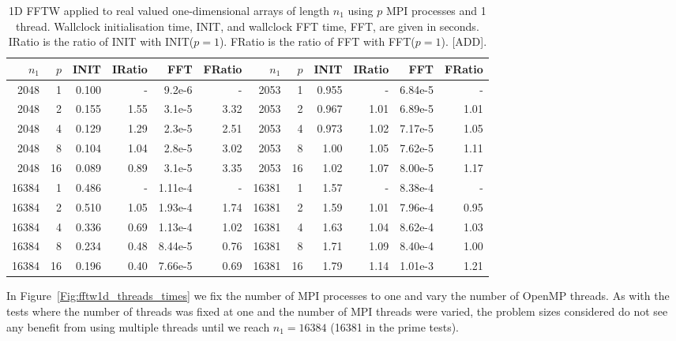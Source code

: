 \documentclass[a4]{article}
\begin{document}
\begin{table}
\begin{center}
\begin{tabular}{|r|r|r|r|r|r||r|r|r|r|r|r|}
\hline $n_1$ & $p$ & INIT & IRatio & FFT & FRatio & $n_1$ & $p$ & INIT & IRatio & FFT & FRatio  \\ \hline
2048 & 1 & 0.100 & -     & 9.2e-6 & - & 2053 & 1  & 0.955 & -   & 6.84e-5 & -   \\
2048 & 2 & 0.155 & 1.55  & 3.1e-5 & 3.32 & 2053 & 2  & 0.967 & 1.01 & 6.89e-5 & 1.01  \\
2048 & 4 & 0.129 & 1.29  & 2.3e-5 & 2.51 & 2053 & 4  & 0.973 & 1.02 & 7.17e-5 & 1.05   \\
2048 & 8 & 0.104 & 1.04  & 2.8e-5 & 3.02 & 2053 & 8  & 1.00 & 1.05 &  7.62e-5 & 1.11  \\
2048 & 16 & 0.089 & 0.89 & 3.1e-5 & 3.35 & 2053 & 16 & 1.02 & 1.07 &  8.00e-5 & 1.17   \\ \hline
16384 & 1 &  0.486 & - &    1.11e-4 & -  & 16381 & 1 & 1.57 & -    & 8.38e-4 & -   \\
16384 & 2 &  0.510 & 1.05 & 1.93e-4 & 1.74 & 16381 & 2 & 1.59 & 1.01 & 7.96e-4 & 0.95    \\
16384 & 4 &  0.336 & 0.69 & 1.13e-4 & 1.02  & 16381 & 4 & 1.63 & 1.04 & 8.62e-4 & 1.03    \\
16384 & 8 &  0.234 & 0.48 & 8.44e-5 & 0.76  & 16381 & 8 & 1.71 & 1.09 & 8.40e-4 & 1.00    \\
16384 & 16 & 0.196 & 0.40 & 7.66e-5 & 0.69  & 16381 & 16 & 1.79 & 1.14 & 1.01e-3 & 1.21   \\ \hline
\end{tabular}
\caption{1D FFTW applied to real valued one-dimensional arrays of length $n_1$ using $p$ MPI processes and 1 thread. Wallclock initialisation time, INIT, and wallclock FFT time, FFT, are given in seconds. IRatio is the ratio of INIT with INIT($p=1$). FRatio is the ratio of FFT with FFT($p=1$).  [ADD].}\label{Tbl:FFT1d}
\end{center}
\end{table}





In Figure~\ref{Fig:fftw1d_threads_times} we fix the number of MPI processes to one and vary the number of OpenMP threads. As with the tests where the number of threads was fixed at one and the number of MPI threads were varied, the problem sizes considered do not see any benefit from using multiple threads until we reach $n_1=16384$ (16381 in the prime tests). 
\end{document}
